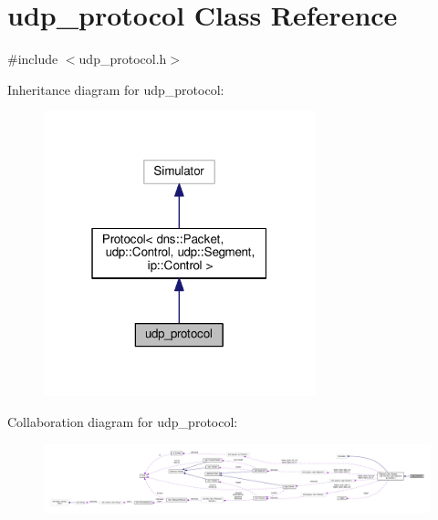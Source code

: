 \hypertarget{classudp__protocol}{}\section{udp\+\_\+protocol Class Reference}
\label{classudp__protocol}


{\ttfamily \#include $<$udp\+\_\+protocol.\+h$>$}



Inheritance diagram for udp\+\_\+protocol\+:\nopagebreak
\begin{figure}[H]
\begin{center}
\leavevmode
\includegraphics[width=223pt]{classudp__protocol__inherit__graph}
\end{center}
\end{figure}


Collaboration diagram for udp\+\_\+protocol\+:\nopagebreak
\begin{figure}[H]
\begin{center}
\leavevmode
\includegraphics[width=350pt]{classudp__protocol__coll__graph}
\end{center}
\end{figure}
